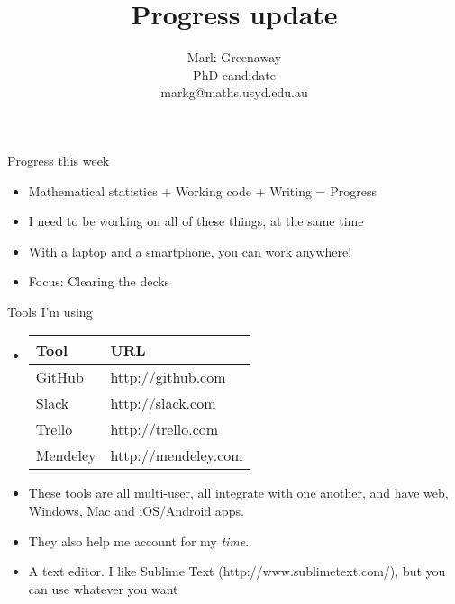 \documentclass{beamer}
\title{Progress update}
\author{Mark Greenaway\\PhD candidate\\markg@maths.usyd.edu.au}
\begin{document}
\begin{frame}
\titlepage
\end{frame}

\begin{frame}{Progress this week}
\begin{itemize}
\item Mathematical statistics + Working code + Writing = Progress
\item I need to be working on all of these things, at the same time
\item With a laptop and a smartphone, you can work anywhere!
\item Focus: Clearing the decks
\end{itemize}
\end{frame}

\begin{frame}{Tools I'm using}
\begin{itemize}
\item \begin{tabular}{|l|l|}
\hline
Tool & URL \\
\hline
GitHub & http://github.com \\
Slack & http://slack.com \\
Trello & http://trello.com \\
Mendeley & http://mendeley.com \\
\hline
\end{tabular}
\item These tools are all multi-user, all integrate with one another, and have web, Windows, Mac and
			iOS/Android apps.
\item They also help me account for my \emph{time}.
\item A text editor. I like Sublime Text (http://www.sublimetext.com/), but you can use whatever you want
\end{itemize}
\end{frame}
\end{document}
